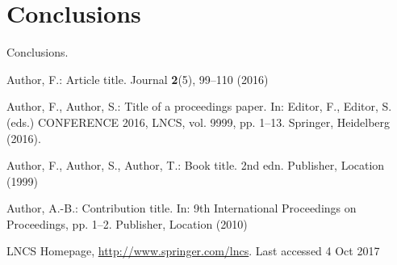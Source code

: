 \documentclass[11pt]{llncs}
\begin{document}
\section{Conclusions}\label{conclusions}
Conclusions.
\begin{thebibliography}{8}
Author, F.: Article title. Journal \textbf{2}(5), 99--110 (2016)

Author, F., Author, S.: Title of a proceedings paper. In: Editor,
F., Editor, S. (eds.) CONFERENCE 2016, LNCS, vol. 9999, pp. 1--13.
Springer, Heidelberg (2016). 

Author, F., Author, S., Author, T.: Book title. 2nd edn. Publisher,
Location (1999)

Author, A.-B.: Contribution title. In: 9th International Proceedings
on Proceedings, pp. 1--2. Publisher, Location (2010)

LNCS Homepage, \url{http://www.springer.com/lncs}. Last accessed 4
Oct 2017
\end{thebibliography}
\end{document}
